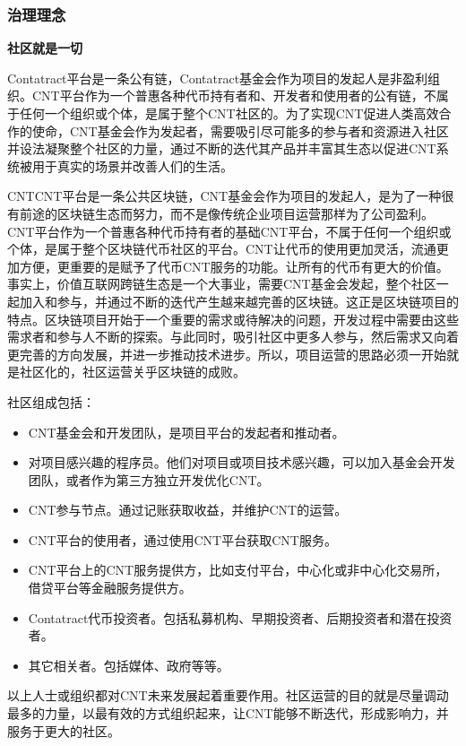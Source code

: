 \documentclass[a4paper,12pt]{article}
\begin{document}
\subsubsection{治理理念}

\textbf{社区就是一切}

Contatract平台是一条公有链，Contatract基金会作为项目的发起人是非盈利组织。CNT平台作为一个普惠各种代币持有者和、开发者和使用者的公有链，不属于任何一个组织或个体，是属于整个CNT社区的。为了实现CNT促进人类高效合作的使命，CNT基金会作为发起者，需要吸引尽可能多的参与者和资源进入社区并设法凝聚整个社区的力量，通过不断的迭代其产品并丰富其生态以促进CNT系统被用于真实的场景并改善人们的生活。

CNTCNT平台是一条公共区块链，CNT基金会作为项目的发起人，是为了一种很有前途的区块链生态而努力，而不是像传统企业项目运营那样为了公司盈利。CNT平台作为一个普惠各种代币持有者的基础CNT平台，不属于任何一个组织或个体，是属于整个区块链代币社区的平台。CNT让代币的使用更加灵活，流通更加方便，更重要的是赋予了代币CNT服务的功能。让所有的代币有更大的价值。事实上，价值互联网跨链生态是一个大事业，需要CNT基金会发起，整个社区一起加入和参与，并通过不断的迭代产生越来越完善的区块链。这正是区块链项目的特点。区块链项目开始于一个重要的需求或待解决的问题，开发过程中需要由这些需求者和参与人不断的探索。与此同时，吸引社区中更多人参与，然后需求又向着更完善的方向发展，并进一步推动技术进步。所以，项目运营的思路必须一开始就是社区化的，社区运营关乎区块链的成败。

社区组成包括：
\begin{itemize}[itemindent=1em]
\item CNT基金会和开发团队，是项目平台的发起者和推动者。
\item 对项目感兴趣的程序员。他们对项目或项目技术感兴趣，可以加入基金会开发团队，或者作为第三方独立开发优化CNT。
\item CNT参与节点。通过记账获取收益，并维护CNT的运营。
\item CNT平台的使用者，通过使用CNT平台获取CNT服务。
\item CNT平台上的CNT服务提供方，比如支付平台，中心化或非中心化交易所，借贷平台等金融服务提供方。
\item Contatract代币投资者。包括私募机构、早期投资者、后期投资者和潜在投资者。
\item 其它相关者。包括媒体、政府等等。
\end{itemize}

以上人士或组织都对CNT未来发展起着重要作用。社区运营的目的就是尽量调动最多的力量，以最有效的方式组织起来，让CNT能够不断迭代，形成影响力，并服务于更大的社区。
\end{document}
